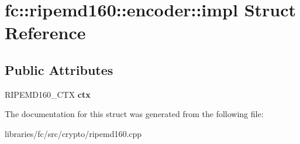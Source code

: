 \hypertarget{structfc_1_1ripemd160_1_1encoder_1_1impl}{}\section{fc\+:\+:ripemd160\+:\+:encoder\+:\+:impl Struct Reference}
\label{structfc_1_1ripemd160_1_1encoder_1_1impl}
\subsection*{Public Attributes}
\begin{DoxyCompactItemize}
\item 
\mbox{\label{structfc_1_1ripemd160_1_1encoder_1_1impl_a4a4d4674fda8a3cbc0b2fcaa95a4d7bd}} 
R\+I\+P\+E\+M\+D160\+\_\+\+C\+TX {\bfseries ctx}
\end{DoxyCompactItemize}


The documentation for this struct was generated from the following file\+:\begin{DoxyCompactItemize}
\item 
libraries/fc/src/crypto/ripemd160.\+cpp\end{DoxyCompactItemize}
